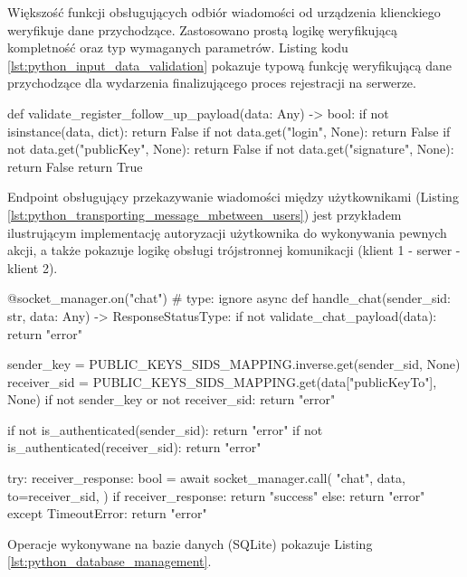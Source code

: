 \documentclass[../main.tex]{subfiles}
\begin{document}
Większość funkcji obsługujących odbiór wiadomości od urządzenia klienckiego weryfikuje dane przychodzące. Zastosowano prostą logikę weryfikującą kompletność oraz typ wymaganych parametrów. Listing kodu \ref{lst:python_input_data_validation} pokazuje typową funkcję weryfikującą dane przychodzące dla wydarzenia finalizującego proces rejestracji na serwerze.

\begin{mypython}[caption={Walidacja danych przychodzących},label={lst:python_input_data_validation}]
def validate_register_follow_up_payload(data: Any) -> bool:
    if not isinstance(data, dict):
        return False
    if not data.get("login", None):
        return False
    if not data.get("publicKey", None):
        return False
    if not data.get("signature", None):
        return False
    return True
\end{mypython}

Endpoint obsługujący przekazywanie wiadomości między użytkownikami (Listing \ref{lst:python_transporting_message_mbetween_users}) jest przykładem ilustrującym implementację autoryzacji użytkownika do wykonywania pewnych akcji, a także pokazuje logikę obsługi trójstronnej komunikacji (klient 1 - serwer - klient 2).

\begin{mypython}[caption={Przekazywanie wiadomości między użytkownikami},label={lst:python_transporting_message_mbetween_users}]
@socket_manager.on("chat")  # type: ignore
async def handle_chat(sender_sid: str, data: Any) -> ResponseStatusType:
    if not validate_chat_payload(data):
        return "error"

    sender_key = PUBLIC_KEYS_SIDS_MAPPING.inverse.get(sender_sid, None)
    receiver_sid = PUBLIC_KEYS_SIDS_MAPPING.get(data["publicKeyTo"], None)
    if not sender_key or not receiver_sid:
        return "error"

    if not is_authenticated(sender_sid):
        return "error"
    if not is_authenticated(receiver_sid):
        return "error"

    try:
        receiver_response: bool = await socket_manager.call(
            "chat",
            data,
            to=receiver_sid,
        )
        if receiver_response:
            return "success"
        else:
            return "error"
    except TimeoutError:
        return "error"
\end{mypython}

\newpage

Operacje wykonywane na bazie danych (SQLite) pokazuje Listing \ref{lst:python_database_management}.
\end{document}
